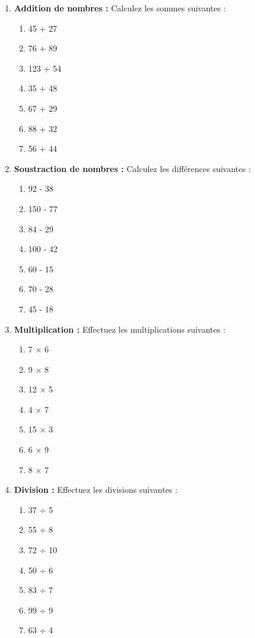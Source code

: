 \documentclass{article}
\begin{document}
\begin{tcolorbox}[colback=yellow!10!white, colframe=yellow!75!black, sharp corners=south, boxrule=0.8mm, title=Exercices]
    \begin{enumerate}[label=\textbf{\arabic*.}]
        \item \textbf{Addition de nombres :} Calculez les sommes suivantes :
        \begin{enumerate}
            \item 45 + 27
            \item 76 + 89
            \item 123 + 54
            \item 35 + 48
            \item 67 + 29
            \item 88 + 32
            \item 56 + 44
        \end{enumerate}

        \item \textbf{Soustraction de nombres :} Calculez les différences suivantes :
        \begin{enumerate}
            \item 92 - 38
            \item 150 - 77
            \item 84 - 29
            \item 100 - 42
            \item 60 - 15
            \item 70 - 28
            \item 45 - 18
        \end{enumerate}

        \item \textbf{Multiplication :} Effectuez les multiplications suivantes :
        \begin{enumerate}
            \item 7 × 6
            \item 9 × 8
            \item 12 × 5
            \item 4 × 7
            \item 15 × 3
            \item 6 × 9
            \item 8 × 7
        \end{enumerate}

        \item \textbf{Division :} Effectuez les divisions suivantes :
        \begin{enumerate}
            \item 37 ÷ 5
            \item 55 ÷ 8
            \item 72 ÷ 10
            \item 50 ÷ 6
            \item 83 ÷ 7
            \item 99 ÷ 9
            \item 63 ÷ 4
        \end{enumerate}


\end{enumerate}
\end{tcolorbox}
\end{document}
